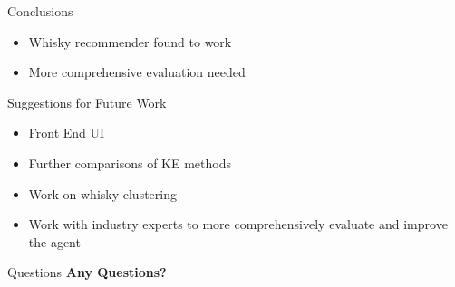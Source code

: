 \documentclass{beamer}
\begin{document}
\begin{frame}{Conclusions}
    
    \begin{itemize}
        \item Whisky recommender found to work
        \item More comprehensive evaluation needed
    \end{itemize}
    \begin{block}{Suggestions for Future Work}
        \begin{itemize}
            \item Front End UI
            \item Further comparisons of KE methods
            \item Work on whisky clustering
            \item Work with industry experts to more comprehensively evaluate and improve the agent
        \end{itemize}
    \end{block}

\end{frame}

\begin{frame}{Questions}
\textbf{Any Questions?}
\end{frame}

\end{document}
